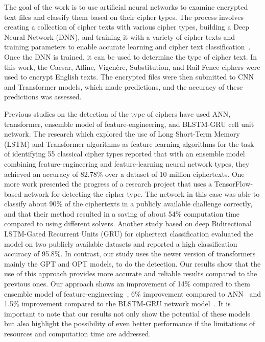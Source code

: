 \documentclass[runningheads]{llncs}
\begin{document}
The goal of the work is to use artificial neural networks to examine encrypted text files and classify them based on their cipher types. The process involves creating a collection of cipher texts with various cipher types, building a Deep Neural Network (DNN), and training it with a variety of cipher texts and training parameters to enable accurate learning and cipher text classification~\cite{inproceedings}. Once the DNN is trained, it can be used to determine the type of cipher text. In this work, the Caesar, Affine, Vigenère, Substitution, and Rail Fence ciphers were used to encrypt English texts. The encrypted files were then submitted to CNN and Transformer models, which made predictions, and the accuracy of these predictions was assessed.

Previous studies on the detection of the type of ciphers have used ANN, transformer, ensemble model of feature-engineering, and BLSTM-GRU cell unit network. The research which explored the use of Long Short-Term Memory (LSTM) and Transformer algorithms as feature-learning algorithms for the task of identifying 55 classical cipher types reported that with an ensemble model combining feature-engineering and feature-learning neural network types, they achieved an accuracy of 82.78\% over a dataset of 10 million ciphertexts. One more work presented the progress of a research project that uses a TensorFlow-based network for detecting the cipher type. The network in this case was able to classify about 90\% of the ciphertexts in a publicly available challenge correctly, and that their method resulted in a saving of about 54\% computation time compared to using different solvers. Another study based on deep Bidirectional LSTM-Gated Recurrent Units (GRU) for ciphertext classification evaluated the model on two publicly available datasets and reported a high classification accuracy of 95.8\%. In contrast, our study uses the newer version of transformers mainly the GPT and OPT models, to do the detection. Our results show that the use of this approach provides more accurate and reliable results compared to the previous ones. Our approach shows an improvement of 14\% compared to them ensemble model of feature-engineering~\cite{usingFeatureLearning}, 6\% improvement compared to ANN~\cite{inproceedings} and 1.5\% improvement compared to the BLSTM-GRU network model~\cite{usingLSTM}. It is important to note that our results not only show the potential of these models but also highlight the possibility of even better performance if the limitations of resources and computation time are addressed.  
\end{document}
